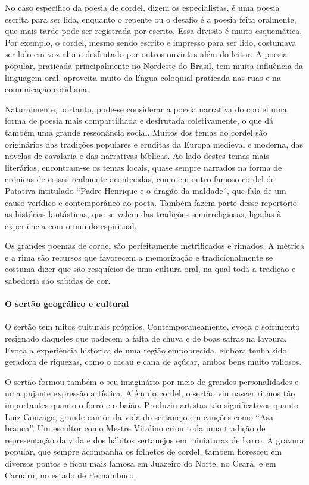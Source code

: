 \documentclass[11pt]{extarticle}
\begin{document}
No caso específico da poesia de cordel, dizem os especialistas, é uma poesia escrita para
ser lida, enquanto o repente ou o desafio é a poesia feita oralmente, que mais tarde pode
ser registrada por escrito. Essa divisão é muito esquemática. Por exemplo, o
cordel, mesmo sendo escrito e impresso para ser lido, costumava ser lido em
voz alta e desfrutado por outros ouvintes além do leitor. A poesia popular,
praticada principalmente no Nordeste do Brasil, tem muita influência da
linguagem oral, aproveita muito da língua coloquial praticada nas ruas e na
comunicação cotidiana. 

Naturalmente, portanto, pode-se considerar a poesia narrativa do cordel uma
forma de poesia mais compartilhada e desfrutada coletivamente, o que dá também
uma grande ressonância social. Muitos dos temas do cordel são originários das
tradições populares e eruditas da Europa medieval e moderna, das novelas de cavalaria e das narrativas
bíblicas. Ao lado destes temas mais literários, encontram-se os temas locais,
quase sempre narrados na forma de crônicas de coisas realmente acontecidas,
como em outro famoso cordel de Patativa intitulado  “Padre Henrique e o dragão da maldade”, que fala de um causo verídico e contemporâneo ao poeta. Também fazem parte desse repertório as histórias
fantásticas, que se valem das tradições semirreligiosas, ligadas à experiência
com o mundo espiritual. 

Os grandes poemas de cordel são perfeitamente metrificados e rimados. A métrica
e a rima são recursos que favorecem a memorização e tradicionalmente se costuma
dizer que são resquícios de uma cultura oral, na qual toda a tradição e
sabedoria são sabidas de cor.  


\paragraph{O sertão geográfico e cultural}

O sertão tem mitos culturais próprios. Contemporaneamente, evoca o sofrimento resignado daqueles que padecem a falta de chuva e
de boas safras na lavoura. Evoca a experiência histórica de uma região
empobrecida, embora tenha sido geradora de riquezas, como o cacau e cana de
açúcar, ambos bens muito valiosos. 

O sertão formou também o seu imaginário por meio de grandes personalidades e
uma pujante expressão artística. Além do cordel, o sertão viu nascer ritmos tão
importantes quanto o forró e o baião. Produziu artistas tão significativos quanto
Luiz Gonzaga, grande cantor da vida do sertanejo em canções como “Asa branca”.
Um escultor como Mestre Vitalino criou toda uma tradição de representação da
vida e dos hábitos sertanejos em miniaturas de barro. A gravura popular, que
sempre acompanha os folhetos de cordel, também floresceu em diversos pontos e
ficou mais famosa em Juazeiro do Norte, no Ceará, e em Caruaru, no estado de
Pernambuco. 
\end{document}
